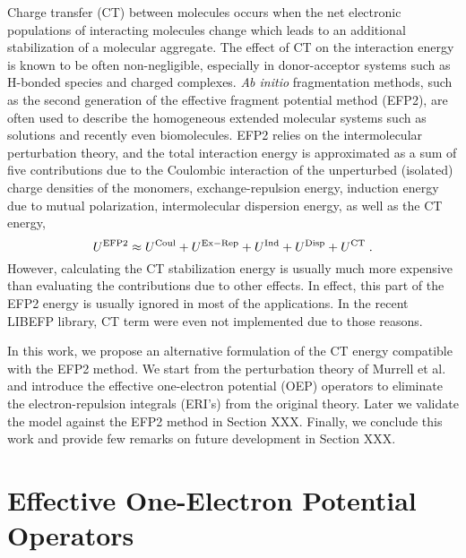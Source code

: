 Charge transfer (CT) between molecules occurs when the net electronic populations 
of interacting molecules change which leads to an additional stabilization 
of a molecular aggregate. The effect of CT on the interaction energy 
is known to be often non\hyp{}negligible, especially
in donor\hyp{}acceptor systems such as H\hyp{}bonded species
and charged complexes.
\emph{Ab initio} fragmentation methods, such as
the second generation of the effective fragment potential method (EFP2),
are often used to describe the homogeneous extended molecular systems 
such as solutions
and recently even biomolecules. EFP2 relies on the intermolecular 
perturbation theory, and the total interaction energy is approximated as
a sum of five contributions due to the Coulombic interaction of the unperturbed (isolated)
charge densities of the monomers, exchange\hyp{}repulsion energy,
induction energy due to mutual polarization, intermolecular dispersion energy,
as well as the CT energy,
%
\begin{equation}
 U^{\rm EFP2} \approx U^{\rm Coul} + U^{\rm Ex-Rep} + U^{\rm Ind} + U^{\rm Disp} + U^{\rm CT} \;.
\end{equation}
%
However, calculating the CT stabilization energy is usually much more expensive 
than evaluating the contributions due to other effects.\cite{Gordon.Fedorov.Pruitt.Slipchenko.ChemRev.2012}
In effect,
this part of the EFP2 energy is usually ignored in most of the applications. In the 
recent LIBEFP library, CT term were even not implemented due to those reasons.

In this work, we propose an alternative formulation of the CT energy compatible with the
EFP2 method. We start from the perturbation theory of Murrell et al.
and
introduce the effective one\hyp{}electron potential (OEP) operators
to eliminate the electron\hyp{}repulsion integrals (ERI's) from the original theory.
Later we validate the model against the EFP2 method in Section XXX. Finally,
we conclude this work and provide few remarks on future development in Section XXX.

\section{\label{s:2}Effective One-Electron Potential Operators}

